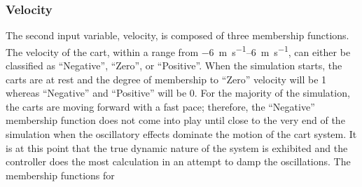 \subsubsection{Velocity} The second input variable, velocity, is composed of three membership functions. The
velocity of the cart, within a range from \SIrange{-6}{6}{\metre\per\second}, can either be classified as
``Negative'', ``Zero'', or ``Positive''. When the simulation starts, the carts are at rest and the degree of
membership to ``Zero'' velocity will be 1 whereas ``Negative'' and ``Positive'' will be 0. For the majority of
the simulation, the carts are moving forward with a fast pace; therefore, the ``Negative'' membership function
does not come into play until close to the very end of the  simulation when the oscillatory effects dominate
the motion of the cart system. It is at this point that the true dynamic nature of the system is exhibited and
the controller does the most calculation in an attempt to damp the oscillations. The membership functions for
